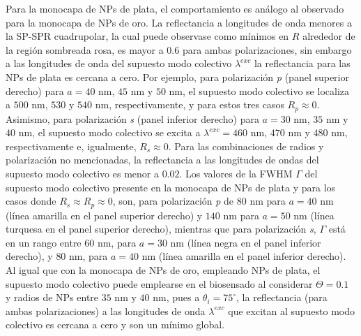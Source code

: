 Para la monocapa de NPs de plata, el comportamiento es análogo al observado para la monocapa de NPs de oro. La reflectancia a longitudes de onda menores a la SP-SPR cuadrupolar, la cual puede observase como mínimos en $R$ alrededor de la región sombreada rosa, es mayor a $0.6$ para ambas polarizaciones, sin embargo a las longitudes de onda del supuesto modo colectivo $\lambda^{exc}$ la reflectancia para las NPs de plata es cercana a cero. Por ejemplo, para polarización \emph{p} (panel superior derecho) para $a=40$ nm, $45$ nm y $50$ nm, el supuesto modo colectivo se localiza a $500$ nm, $530$ y $540$ nm, respectivamente, y para estos tres casos $R_p\approx 0$. Asimismo, para polarización \emph{s} (panel inferior derecho) para $a=30$ nm, $35$ nm y $40$ nm, el supuesto modo colectivo se excita a $\lambda^{exc}=460$ nm, $470$ nm y $480$ nm, respectivamente e, igualmente, $R_s\approx 0$. Para las combinaciones de radios y polarización no mencionadas, la reflectancia a las longitudes de ondas del supuesto modo colectivo es menor a $0.02$. Los valores de la FWHM $\Gamma$ del supuesto modo colectivo presente en la monocapa de NPs de plata y para los casos donde $R_s\approx R_p \approx 0$, son, para polarización \emph{p} de $80$ nm para $a=40$ nm (línea amarilla en el panel superior derecho) y $140$ nm para $a=50$ nm (línea turquesa en el panel superior derecho), mientras que para polarización \emph{s}, $\Gamma$ está en un rango entre $60$ nm, para $a=30$ nm (línea negra en el panel inferior derecho), y $80$ nm, para $a=40$ nm (línea amarilla en el panel inferior derecho). Al igual que con la monocapa de NPs de oro, empleando NPs de plata, el supuesto modo colectivo puede emplearse en el biosensado al considerar $\Theta=0.1$ y radios de NPs entre $35$ nm y $40$ nm, pues a $\theta_i=75^\circ$, la reflectancia (para ambas polarizaciones) a las longitudes de onda  $\lambda^{exc}$ que excitan al supuesto modo colectivo es cercana a cero y son un mínimo global.

